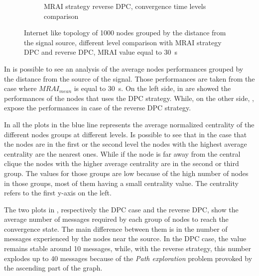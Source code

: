 \begin{figure}[h]
\begin{subfigure}[b]{0.49\textwidth}
		 \caption{\ac{MRAI} strategy reverse \ac{DPC}, convergence time levels comparison}
         \label{fig:different_levels_comparison_reverse_dpc_time}
     \end{subfigure}
     \hfill
	 \caption{Internet like topology of \num{1000} nodes grouped by the distance
	 from the signal source, different level comparison with \ac{MRAI} strategy
	 \ac{DPC} and reverse \ac{DPC}, \ac{MRAI} value equal to \SI{30}{\second}
	 }
	 \label{fig:different_levels_comparison}
\end{figure}

In  is possible to see an analysis of the
average nodes performances grouped by the distance from the source of the signal.
Those performances are taken from the case where \(MRAI_{mean}\) is equal to
\SI{30}{\second}.
On the left side, in
are showed the performances of the nodes that uses the \ac{DPC} strategy.
While, on the other side, ,
expose the performances in case of the reverse \ac{DPC} strategy.

In all the plots in  the blue line
represents the average normalized centrality of the different nodes groups at different
levels.
Is possible to see that in the case that the nodes are in the first or the
second level the nodes with the highest average centrality are the nearest ones.
While if the node is far away from the central clique the nodes with the
higher average centrality are in the second or third group.
The values for those groups are low because of the high number of nodes
in those groups, most of them having a small centrality value.
The centrality refers to the first y-axis on the left.

The two plots in ,
respectively the \ac{DPC} case and the reverse \ac{DPC},
show the average number of messages required by each group of nodes to reach
the convergence state.
The main difference between them is in the number of messages experienced by
the nodes near the source.
In the \ac{DPC} case, the value remains stable around \num{10} messages, while,
with the reverse strategy, this number explodes up to \num{40} messages because
of the \textit{Path exploration} problem provoked by the ascending part of the graph.

